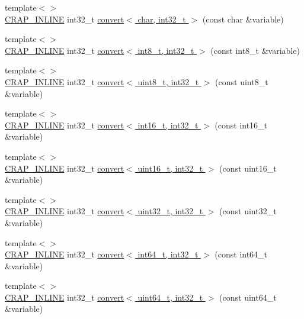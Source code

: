 \begin{DoxyCompactItemize}
\item 
{\footnotesize template$<$$>$ }\\\hyperlink{config__x86_8h_a5a40526b8d842e7ff731509998bb0f1c}{C\+R\+A\+P\+\_\+\+I\+N\+L\+I\+N\+E} int32\+\_\+t \hyperlink{namespacecrap_a02f18134afb81a7e30e7abd5f617d716}{convert$<$ char, int32\+\_\+t $>$} (const char \&variable)
\item 
{\footnotesize template$<$$>$ }\\\hyperlink{config__x86_8h_a5a40526b8d842e7ff731509998bb0f1c}{C\+R\+A\+P\+\_\+\+I\+N\+L\+I\+N\+E} int32\+\_\+t \hyperlink{namespacecrap_a6314ccc10474c864f3f5ef27bf404f86}{convert$<$ int8\+\_\+t, int32\+\_\+t $>$} (const int8\+\_\+t \&variable)
\item 
{\footnotesize template$<$$>$ }\\\hyperlink{config__x86_8h_a5a40526b8d842e7ff731509998bb0f1c}{C\+R\+A\+P\+\_\+\+I\+N\+L\+I\+N\+E} int32\+\_\+t \hyperlink{namespacecrap_a4750f4cab8dbfe70d56225397f2628f1}{convert$<$ uint8\+\_\+t, int32\+\_\+t $>$} (const uint8\+\_\+t \&variable)
\item 
{\footnotesize template$<$$>$ }\\\hyperlink{config__x86_8h_a5a40526b8d842e7ff731509998bb0f1c}{C\+R\+A\+P\+\_\+\+I\+N\+L\+I\+N\+E} int32\+\_\+t \hyperlink{namespacecrap_a2e7636cbe7537299424658e1a343d43e}{convert$<$ int16\+\_\+t, int32\+\_\+t $>$} (const int16\+\_\+t \&variable)
\item 
{\footnotesize template$<$$>$ }\\\hyperlink{config__x86_8h_a5a40526b8d842e7ff731509998bb0f1c}{C\+R\+A\+P\+\_\+\+I\+N\+L\+I\+N\+E} int32\+\_\+t \hyperlink{namespacecrap_a559a2c690502997be081496b58a3d3ac}{convert$<$ uint16\+\_\+t, int32\+\_\+t $>$} (const uint16\+\_\+t \&variable)
\item 
{\footnotesize template$<$$>$ }\\\hyperlink{config__x86_8h_a5a40526b8d842e7ff731509998bb0f1c}{C\+R\+A\+P\+\_\+\+I\+N\+L\+I\+N\+E} int32\+\_\+t \hyperlink{namespacecrap_a0dc939761075d09d9212ba3aae3fa193}{convert$<$ uint32\+\_\+t, int32\+\_\+t $>$} (const uint32\+\_\+t \&variable)
\item 
{\footnotesize template$<$$>$ }\\\hyperlink{config__x86_8h_a5a40526b8d842e7ff731509998bb0f1c}{C\+R\+A\+P\+\_\+\+I\+N\+L\+I\+N\+E} int32\+\_\+t \hyperlink{namespacecrap_aed465f067917131b48e7cf94916c8674}{convert$<$ int64\+\_\+t, int32\+\_\+t $>$} (const int64\+\_\+t \&variable)
\item 
{\footnotesize template$<$$>$ }\\\hyperlink{config__x86_8h_a5a40526b8d842e7ff731509998bb0f1c}{C\+R\+A\+P\+\_\+\+I\+N\+L\+I\+N\+E} int32\+\_\+t \hyperlink{namespacecrap_a743392dae0ed95923b160d130cea5251}{convert$<$ uint64\+\_\+t, int32\+\_\+t $>$} (const uint64\+\_\+t \&variable)

\end{DoxyCompactItemize}

